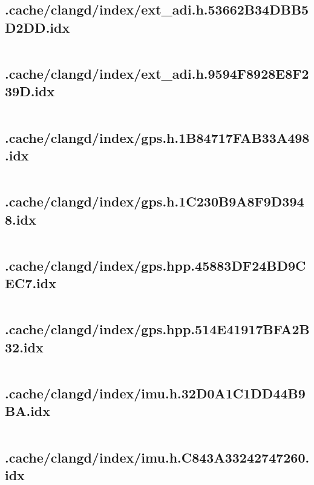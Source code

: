 \subsection{.cache/clangd/index/ext_adi.h.53662B34DBB5D2DD.idx}
\inputminted[linenos,tabsize=2,breaklines, breakanywhere]{c}{ext_adi.h.53662B34DBB5D2DD.idx}
\pagebreak

\subsection{.cache/clangd/index/ext_adi.h.9594F8928E8F239D.idx}
\inputminted[linenos,tabsize=2,breaklines, breakanywhere]{c}{ext_adi.h.9594F8928E8F239D.idx}
\pagebreak

\subsection{.cache/clangd/index/gps.h.1B84717FAB33A498.idx}
\inputminted[linenos,tabsize=2,breaklines, breakanywhere]{c}{gps.h.1B84717FAB33A498.idx}
\pagebreak

\subsection{.cache/clangd/index/gps.h.1C230B9A8F9D3948.idx}
\inputminted[linenos,tabsize=2,breaklines, breakanywhere]{c}{gps.h.1C230B9A8F9D3948.idx}
\pagebreak

\subsection{.cache/clangd/index/gps.hpp.45883DF24BD9CEC7.idx}
\inputminted[linenos,tabsize=2,breaklines, breakanywhere]{c}{gps.hpp.45883DF24BD9CEC7.idx}
\pagebreak

\subsection{.cache/clangd/index/gps.hpp.514E41917BFA2B32.idx}
\inputminted[linenos,tabsize=2,breaklines, breakanywhere]{c}{gps.hpp.514E41917BFA2B32.idx}
\pagebreak

\subsection{.cache/clangd/index/imu.h.32D0A1C1DD44B9BA.idx}
\inputminted[linenos,tabsize=2,breaklines, breakanywhere]{c}{imu.h.32D0A1C1DD44B9BA.idx}
\pagebreak

\subsection{.cache/clangd/index/imu.h.C843A33242747260.idx}
\inputminted[linenos,tabsize=2,breaklines, breakanywhere]{c}{imu.h.C843A33242747260.idx}
\pagebreak

